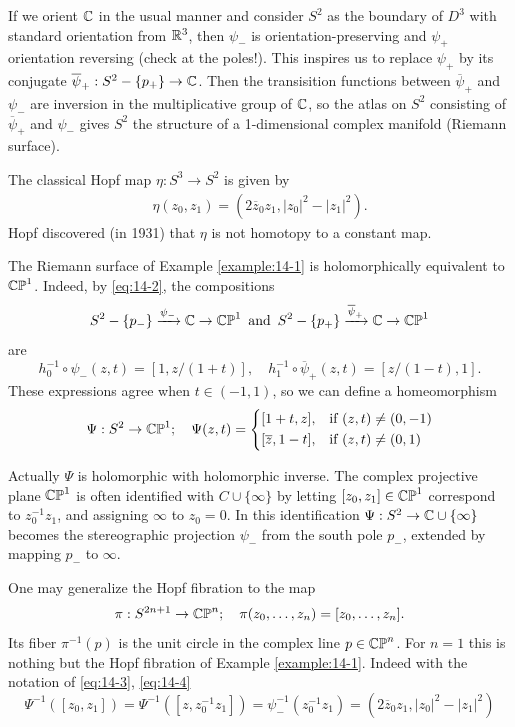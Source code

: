 If we orient ${\mathbb{C}}$ in the usual manner and consider $S^2$ as the boundary of $D^3$ with
standard orientation from ${\mathbb{R}}^3$, then $\psi_{-}$ is orientation-preserving and $\psi_{+}$ 
orientation reversing (check at the poles!). This inspires us to replace $\psi_{+}$ by its conjugate
$\overline{\psi}_{+}:S^2-\{p_+\}\to{\ensuremath{\mathbb{C}}}$. Then the transisition functions between $\overline\psi_{+}$ and $\psi_{-}$ are
inversion in the multiplicative group of ${\mathbb{C}}$, so the atlas on $S^2$ consisting of $\overline\psi_{+}$
and $\psi_{-}$ gives $S^2$ the structure of a 1-dimensional complex manifold (Riemann surface).

The classical Hopf map $\eta:S^3\to S^2$ is given by 
\begin{align}\label{eq:14-3}
  \eta(z_0, z_1) = (2\overline{z}_0z_1, |z_0|^2 - |z_1|^2).
\end{align}
Hopf discovered (in 1931) that $\eta$ is not homotopy to a constant map.

The Riemann surface of Example \ref{example:14-1} is holomorphically equivalent to $\mathbb{CP}^1$.
Indeed, by \eqref{eq:14-2}, the compositions
\[
  S^2-\{p_{-}\}\xra[\psi_{-}] \CC \to \B{CP}^1 \enspace\text{and}\enspace
  S^2-\{p_{+}\}\xra[\overline{\psi}_{+}]\CC \to \B{CP}^1
\]
are
\[
  h_0^{-1}\circ\psi_{-}(z, t) = [1, z/(1+t)], \quad
  h_1^{-1}\circ\overline{\psi}_{+}(z, t) = [z/(1-t), 1].
\] 
These expressions agree when $t\in (-1,1)$, so we can define a homeomorphism
\begin{align}\label{eq:14-4}
  \Psi:S^2\to\mathbb{CP}^1;\quad 
  \Psi(z, t) = \left\{\begin{aligned}
    & [1+t, z], && \text{if } (z, t)\neq (0, -1)\\
    & [\overline{z}, 1-t], && \text{if } (z, t)\neq (0, 1)
  \end{aligned}\right.
\end{align}

Actually $\Psi$ is holomorphic with holomorphic inverse. The complex projective
plane $\mathbb{CP}^1$ is often identified with $C\cup\{\infty\}$ by letting $[z_0, z_1]\in \mathbb{CP}^1$ correspond
to $z_0^{-1}z_1$, and assigning $\infty$ to $z_0=0$. In this identification $\Psi:S^2\to{\ensuremath{\mathbb{C}}}\cup \{\infty\}$
becomes the stereographic projection $\psi_{-}$ from the south pole $p_{-}$, extended by
mapping $p_{-}$ to $\infty$.

One may generalize the Hopf fibration to the map 
\begin{align}\label{eq:14-5}
  \pi:S^{2n+1}\to\mathbb{CP}^n;\quad 
  \pi(z_0, \ldots, z_n) = [z_0, \ldots, z_n].
\end{align}
Its fiber $\pi^{-1}(p)$ is the unit circle in the complex line $p\in\mathbb{CP}^n$. For $n=1$ this 
is nothing but the Hopf fibration of Example \ref{example:14-1}. Indeed with the notation of \eqref{eq:14-3},
\eqref{eq:14-4}
\[
  \Psi^{-1}([z_0, z_1]) =\Psi^{-1}([z, z_0^{-1}z_1])
  = \psi_{-}^{-1}(z_0^{-1}z_1)
  = (2\overline{z}_0z_1, |z_0|^2 - |z_1|^2)
\]

